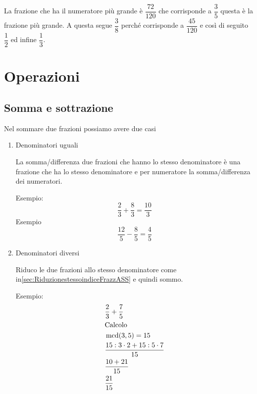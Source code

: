 		La frazione che ha il numeratore più grande è $\dfrac{72}{120}$ che corrisponde a $\dfrac{3}{5}$ questa è la frazione più grande. A questa
		segue $\dfrac{3}{8}$ perché corrisponde a $\dfrac{45}{120}$ e così di seguito $\dfrac{1}{2}$ ed infine $\dfrac{1}{3}$.
	\section{Operazioni}
	\label{sec:OperazioniASS}
	\subsection{Somma e sottrazione}
	\label{ssec:SommaesottrazioniASS}
	Nel sommare due frazioni possiamo avere due casi 
	\begin{enumerate}
		\item Denominatori uguali
		
		La somma/differenza due frazioni che hanno lo stesso denominatore è una frazione che ha lo stesso denominatore e per numeratore la somma/differenza dei numeratori. 
		
		Esempio: \[\dfrac{2}{3}+\dfrac{8}{3}=\dfrac{10}{3}\] Esempio \[\dfrac{12}{5}-\dfrac{8}{5}=\dfrac{4}{5}\]
		\item Denominatori diversi
		
		Riduco le due frazioni allo stesso denominatore come in\nobs\vref{sec:RiduzionestessoindiceFrazzASS} e quindi sommo.
		
		Esempio:\begin{align*}
		&\dfrac{2}{3}+\dfrac{7}{5}\\
		&\text{Calcolo}\\
		&\operatorname{mcd}(3,5)=15\\
		&\dfrac{15:3\cdot 2+15:5\cdot 7}{15}\\
		&\dfrac{10+21}{15}\\
		&\dfrac{21}{15}
		\end{align*}
	\end{enumerate}
